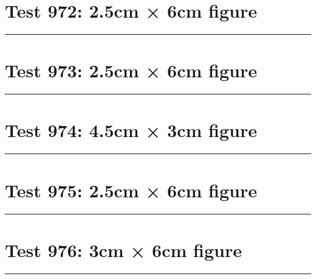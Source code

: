 \documentclass[a4paper,11pt]{article}
\begin{document}
\section*{Test 972: 2.5cm × 6cm figure}
\begin{swarmwrap}%
  \begin{minipage}[t]{2cm}
    \centering
    \rule{\linewidth}{6cm}
  \end{minipage}%
\end{swarmwrap}%
\swarmwrapnext
\lipsum[122]
\lipsum[123]
\lipsum[124]
\section*{Test 973: 2.5cm × 6cm figure}
\begin{swarmwrap}%
  \begin{minipage}[t]{2cm}
    \centering
    \rule{\linewidth}{6cm}
  \end{minipage}%
\end{swarmwrap}%
\swarmwrapnext
\lipsum[87]
\lipsum[88]
\lipsum[89]
\lipsum[90]
\section*{Test 974: 4.5cm × 3cm figure}
\begin{swarmwrap}%
  \begin{minipage}[t]{4cm}
    \centering
    \rule{\linewidth}{3cm}
  \end{minipage}%
\end{swarmwrap}%
\swarmwrapnext
\lipsum[92]
\lipsum[93]
\lipsum[94]
\lipsum[95]
\section*{Test 975: 2.5cm × 6cm figure}
\begin{swarmwrap}%
  \begin{minipage}[t]{2cm}
    \centering
    \rule{\linewidth}{6cm}
  \end{minipage}%
\end{swarmwrap}%
\swarmwrapnext
\lipsum[86]
\lipsum[87]
\lipsum[88]
\lipsum[89]
\lipsum[90]
\lipsum[91]
\section*{Test 976: 3cm × 6cm figure}
\begin{swarmwrap}%
  \begin{minipage}[t]{3cm}
    \centering
    \rule{\linewidth}{6cm}
  \end{minipage}%
\end{swarmwrap}%
\swarmwrapnext
\lipsum[120]
\lipsum[121]
\lipsum[122]
\lipsum[123]
\lipsum[124]
\end{document}
